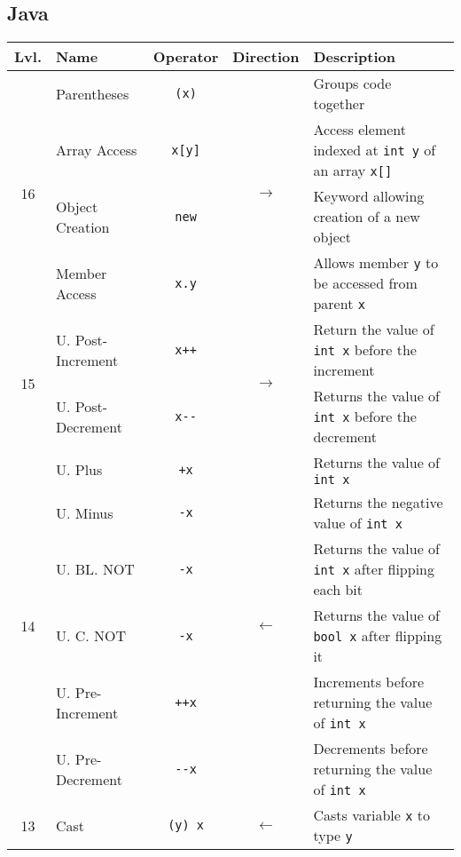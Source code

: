 \documentclass{article}
\begin{document}
\subsection{Java}
\begin{center}\begin{tabularx}{\textwidth}{clccX}\toprule
  Lvl.                & \quad Name        & Operator          & Direction & \qquad Description \\\midrule
  \multirow{4}{*}{16} & Parentheses       & \lstinline|(x)|   & \multirow{4}{*}{\(\rightarrow\)}& Groups code together \\
                      & Array Access      & \lstinline|x[y]|  & & Access element indexed at \lstinline|int y| of an array \lstinline|x[]|\\
                      & Object Creation   & \lstinline|new|   & & Keyword allowing creation of a new object\\
                      & Member Access     & \lstinline|x.y|   & & Allows member \lstinline|y| to be accessed from parent \lstinline|x| \\ \midrule
  \multirow{2}{*}{15} & U. Post-Increment & \lstinline|x++|   & \multirow{2}{*}{\(\rightarrow\)} & Return the value of \lstinline|int x| before the increment \\
                      & U. Post-Decrement & \lstinline|x--|   & & Returns the value of \lstinline|int x| before the decrement\\\midrule
  \multirow{6}{*}{14} & U. Plus           & \lstinline|+x|    & \multirow{6}{*}{\(\leftarrow\)} & Returns the value of \lstinline|int x|\\
                      & U. Minus          & \lstinline|-x|    & & Returns the negative value of \lstinline|int x| \\
                      & U. BL. NOT         & \lstinline|-x|    & & Returns the value of \lstinline|int x| after flipping each bit\\
                      & U. C. NOT         & \lstinline|-x|    & & Returns the value of \lstinline|bool x| after flipping it \\
                      & U. Pre-Increment  & \lstinline|++x|   & & Increments before returning the value of \lstinline|int x| \\
                      & U. Pre-Decrement  & \lstinline|--x|   & & Decrements before returning the value of \lstinline|int x| \\\midrule
                  13  & Cast              & \lstinline|(y) x| & \(\leftarrow\) & Casts variable \lstinline|x| to type \lstinline|y| \\\midrule

\end{tabularx}
\end{center}
\end{document}
